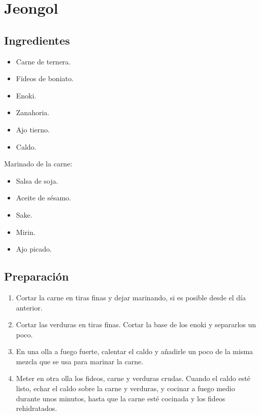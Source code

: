 \documentclass[
]{book}
\providecommand{\tightlist}{%
  \setlength{\itemsep}{0pt}\setlength{\parskip}{0pt}}
\begin{document}
\hypertarget{jeongol}{%
\chapter{Jeongol}\label{jeongol}}

\hypertarget{ingredientes-4}{%
\section*{Ingredientes}\label{ingredientes-4}}

\begin{itemize}
\tightlist
\item
  Carne de ternera.
\item
  Fideos de boniato.
\item
  Enoki.
\item
  Zanahoria.
\item
  Ajo tierno.
\item
  Caldo.
\end{itemize}

Marinado de la carne:

\begin{itemize}
\tightlist
\item
  Salsa de soja.
\item
  Aceite de sésamo.
\item
  Sake.
\item
  Mirin.
\item
  Ajo picado.
\end{itemize}

\hypertarget{preparaciuxf3n-4}{%
\section*{Preparación}\label{preparaciuxf3n-4}}

\begin{enumerate}
\def\labelenumi{\arabic{enumi}.}
\tightlist
\item
  Cortar la carne en tiras finas y dejar marinando, si es posible desde el día anterior.
\item
  Cortar las verduras en tiras finas. Cortar la base de los enoki y separarlos un poco.
\item
  En una olla a fuego fuerte, calentar el caldo y añadirle un poco de la misma mezcla que se usa para marinar la carne.
\item
  Meter en otra olla los fideos, carne y verduras crudas. Cuando el caldo esté listo, echar el caldo sobre la carne y verduras, y cocinar a fuego medio durante unos minutos, hasta que la carne esté cocinada y los fideos rehidratados.
\end{enumerate}
\end{document}
